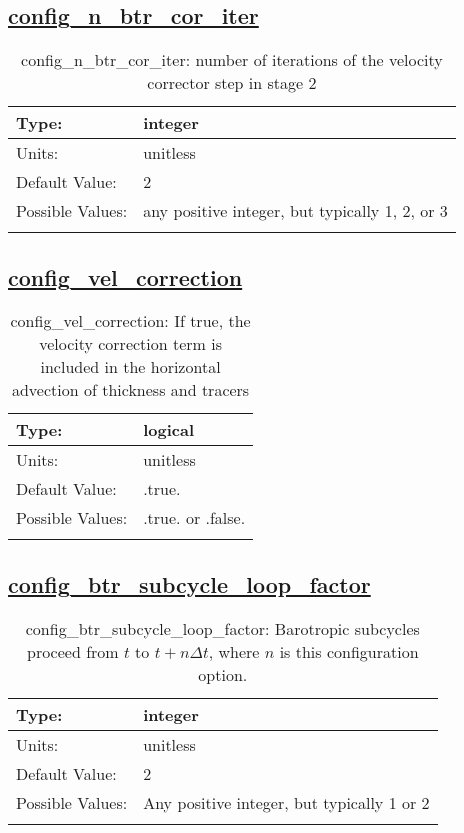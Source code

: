 \subsection[config\_n\_btr\_cor\_iter]{\hyperref[sec:nm_tab_split_explicit_ts]{config\_n\_btr\_cor\_iter}}
\label{subsec:nm_sec_config_n_btr_cor_iter}
\begin{center}
\begin{longtable}{| p{2.0in} || p{4.0in} |}
    \hline
    Type: & integer \\
    \hline
    Units: & \si{unitless} \\
    \hline
    Default Value: & 2 \\
    \hline
    Possible Values: & any positive integer, but typically 1, 2, or 3 \\
    \hline
    \caption{config\_n\_btr\_cor\_iter: number of iterations of the velocity corrector step in stage 2}
\end{longtable}
\end{center}
\subsection[config\_vel\_correction]{\hyperref[sec:nm_tab_split_explicit_ts]{config\_vel\_correction}}
\label{subsec:nm_sec_config_vel_correction}
\begin{center}
\begin{longtable}{| p{2.0in} || p{4.0in} |}
    \hline
    Type: & logical \\
    \hline
    Units: & \si{unitless} \\
    \hline
    Default Value: & .true. \\
    \hline
    Possible Values: & .true. or .false. \\
    \hline
    \caption{config\_vel\_correction: If true, the velocity correction term is included in the horizontal advection of thickness and tracers}
\end{longtable}
\end{center}
\subsection[config\_btr\_subcycle\_loop\_factor]{\hyperref[sec:nm_tab_split_explicit_ts]{config\_btr\_subcycle\_loop\_factor}}
\label{subsec:nm_sec_config_btr_subcycle_loop_factor}
\begin{center}
\begin{longtable}{| p{2.0in} || p{4.0in} |}
    \hline
    Type: & integer \\
    \hline
    Units: & \si{unitless} \\
    \hline
    Default Value: & 2 \\
    \hline
    Possible Values: & Any positive integer, but typically 1 or 2 \\
    \hline
    \caption{config\_btr\_subcycle\_loop\_factor: Barotropic subcycles proceed from $t$ to $t+n\Delta t$, where $n$ is this configuration option.}
\end{longtable}
\end{center}
